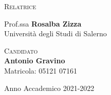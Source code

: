 \documentclass{article}
\begin{document}
        {\large {}
            \begin{multicols}{2}
                \begin{adjustwidth}{0pt}{0pt}\textsc{Relatrice}\end{adjustwidth}
                Prof.ssa \textbf{Rosalba Zizza}\\
                Università degli Studi di Salerno
                
                \columnbreak
                
                \hspace*{\fill}\textsc{Candidato}\\
                \hspace*{\fill}\textbf{Antonio Gravino}\\
                \hspace*{\fill}Matricola: 05121 07161
            \end{multicols}
        }
        
        \begin{center}
            \vspace*{\fill}Anno Accademico 2021-2022
        \end{center}
        
        \break
        
        
        
        \vspace{-15mm}
        
        \tableofcontents

        
\end{document}
